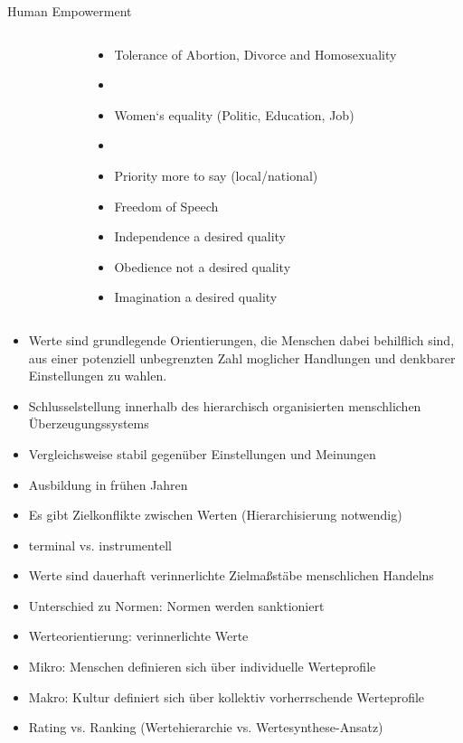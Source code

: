 \documentclass[11pt]{beamer}
\begin{document}
\begin{frame}{Human Empowerment \parencite[71]{Welzel2013}}
\begin{columns}
\begin{column}{0.3\textwidth}
		\end{column}
		\begin{column}{0.7\textwidth}
			\begin{itemize}
				\item Tolerance of Abortion, Divorce and Homosexuality
				\item[]
				\item Women‘s equality (Politic, Education, Job)
				\item[]
				\item Priority more to say (local/national)
				\item Freedom of Speech
				\item Independence a desired quality
				\item Obedience not a desired quality
				\item Imagination a desired quality
			\end{itemize}
		\end{column}
	\end{columns}

\end{frame}

\begin{frame}{\cite{Scherer2020}}
	\begin{itemize}
		\item Werte sind grundlegende Orientierungen, die Menschen dabei behilflich sind, aus einer potenziell unbegrenzten Zahl moglicher Handlungen und denkbarer Einstellungen zu wahlen. \parencite[210]{Scherer2020}
		\item Schlusselstellung innerhalb des hierarchisch organisierten menschlichen Überzeugungssystems
		\item Vergleichsweise stabil gegenüber Einstellungen und Meinungen 
		\item Ausbildung in frühen Jahren
		\item Es gibt Zielkonflikte zwischen Werten (Hierarchisierung notwendig) 
		\item terminal vs. instrumentell
	\end{itemize}
\end{frame}

\begin{frame}{\cite{Welzel2009}}
	\begin{itemize}
		\item Werte sind dauerhaft verinnerlichte Zielmaßstäbe menschlichen Handelns
		\item Unterschied zu Normen: Normen werden sanktioniert
		\item Werteorientierung: verinnerlichte Werte
		\item Mikro: Menschen definieren sich über individuelle Werteprofile
		\item Makro: Kultur definiert sich über kollektiv vorherrschende Werteprofile
		\item Rating vs. Ranking (Wertehierarchie vs. Wertesynthese-Ansatz)
	\end{itemize}
\end{frame}
\end{document}
